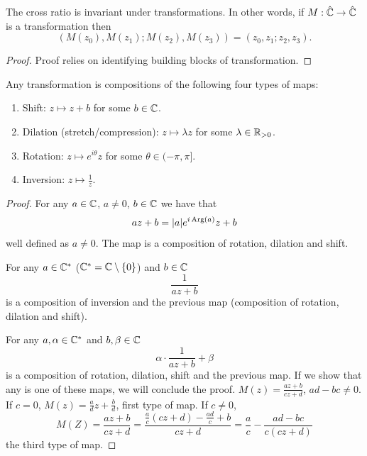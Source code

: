 \documentclass[10pt, a4paper]{article}
\begin{document}
\begin{lemma}
    The cross ratio is invariant under \mobius transformations.
    In other words,
    if $M :\hat{\mathbb{C}} \to \hat{\mathbb{C}}$ is a \mobius transformation then
    \[
    (M(z_0), M(z_1); M(z_2), M(z_3)) = (z_0, z_1; z_2, z_3).
    \]

    \begin{proof}
        Proof relies on identifying building blocks of \mobius transformation.
    \end{proof}
\end{lemma}

\begin{lemma}
    Any \mobius transformation is compositions of the following four types of maps:

    \begin{enumerate}[label = (\roman*)]
        \item Shift:
        $z \mapsto z + b$ for some $b \in \mathbb{C}$.

        \item Dilation
        (stretch/compression):
        $z \mapsto \lambda z$ for some $\lambda \in \mathbb{R}_{> 0}$.

        \item Rotation:
        $z \mapsto e ^ {i\theta}z$ for some $\theta \in (-\pi, \pi]$.

        \item Inversion:
        $z \mapsto \frac{1}{z}$.
    \end{enumerate}

    \begin{proof}
        For any $a \in \mathbb{C}$,
        $a \neq 0$,
        $b \in \mathbb{C}$ we have that
        \[
        az + b = |a|e ^ {i\operatorname{Arg}(a)}z + b
        \]
        well defined as $a \neq 0$.
        The map is a composition of rotation,
        dilation and shift.

        For any $a \in \mathbb{C} ^ {*}$
        ($\mathbb{C} ^ {*} = \mathbb{C} \setminus \{0\}$)
        and $b \in \mathbb{C}$
        \[
        \frac{1}{az + b}
        \]
        is a composition of inversion and the previous map
        (composition of rotation,
        dilation and shift).

        For any $a, \alpha \in \mathbb{C} ^ {*}$ and $b, \beta \in \mathbb{C}$
        \[
        \alpha \cdot \frac{1}{az + b} + \beta
        \]
        is a composition of rotation,
        dilation,
        shift and the previous map.
        If we show that any \mobius is one of these maps,
        we will conclude the proof.
        $M(z) = \frac{az + b}{cz + d}$,
        $ad - bc \neq 0$.
        If $c = 0$,
        $M(z) = \frac{a}{d}z + \frac{b}{d}$,
        first type of map.
        If $c \neq 0$,
        \[
        M(Z) = \frac{az + b}{cz + d} = \frac{\frac{a}{c}(cz + d) - \frac{ad}{c} + b}{cz + d} = \frac{a}{c} - \frac{ad - bc}{c(cz + d)}
        \]
        the third type of map.
    \end{proof}
\end{lemma}
\end{document}
